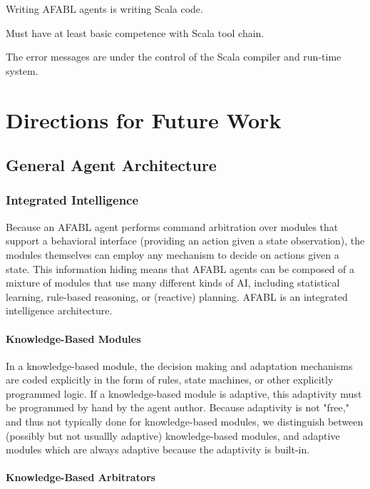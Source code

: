 Writing AFABL agents is writing Scala code.

Must have at least basic competence with Scala tool chain.

The error messages are under the control of the Scala compiler and run-time system.

\section{Directions for Future Work}

\subsection{General Agent Architecture}

\subsubsection{Integrated Intelligence}

Because an AFABL agent performs command arbitration over modules that
support a behavioral interface (providing an action given a state
observation), the modules themselves can employ any mechanism to
decide on actions given a state.  This information hiding means that
AFABL agents can be composed of a mixture of modules that use many
different kinds of AI, including statistical learning, rule-based
reasoning, or (reactive) planning.  AFABL is an integrated
intelligence architecture.

\paragraph{Knowledge-Based Modules}

In a knowledge-based module, the decision making and adaptation
mechanisms are coded explicitly in the form of rules, state machines,
or other explicitly programmed logic.  If a knowledge-based module is
adaptive, this adaptivity must be programmed by hand by the agent
author.  Because adaptivity is not "free," and thus not typically done
for knowledge-based modules, we distinguish between (possibly but not
usuallly adaptive) knowledge-based modules, and adaptive modules which
are always adaptive because the adaptivity is built-in.

\paragraph{Knowledge-Based Arbitrators}

